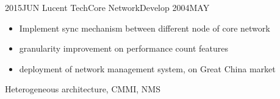 \begin{experiences}
	\emptySeparator
	\experience
	{2015JUN} {Lucent Tech}{Core Network}{Develop}
	{2004MAY}    {
		\begin{itemize}
			\item Implement sync mechanism between different node of core network
			\item granularity improvement on performance count features 
			\item deployment of network management system, on Great China market
		\end{itemize}
	}
	{Heterogeneous architecture, CMMI, NMS} 
	\emptySeparator
\end{experiences}
